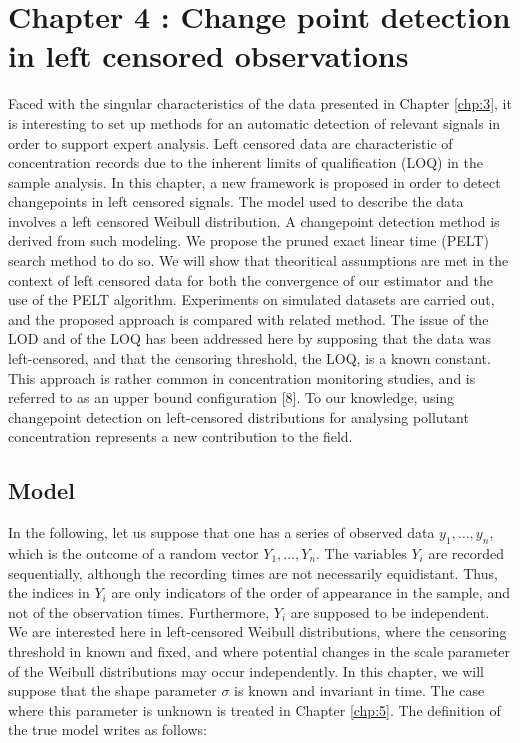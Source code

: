 \chapter{Chapter 4 : Change point detection in left censored observations}\label{chp:4}

\minitoc

Faced with the singular characteristics of the data presented in Chapter \ref{chp:3}, it is interesting to set up methods for an automatic detection of relevant signals in order to support expert analysis. Left censored data are characteristic of concentration records due to the inherent limits of qualification (LOQ) in the sample analysis. In this chapter, a new framework is proposed in order to detect changepoints in left censored signals. The model used to describe the data involves a left censored Weibull distribution. A changepoint detection method is derived from such modeling. We propose the pruned exact linear time (PELT) search method to do so. We will show that theoritical assumptions are met in the context of left censored data for both the convergence of our estimator and the use of the PELT algorithm. Experiments on simulated datasets are carried out, and the proposed approach is compared with related method. The issue of the LOD and of the LOQ has been addressed here by supposing that the data was left-censored, and that the censoring threshold, the LOQ, is a known constant. This approach is rather common in concentration monitoring studies, and is referred to as an upper bound configuration [8]. To our knowledge, using changepoint detection on left-censored distributions for analysing pollutant concentration represents a new contribution to the field. 

\section{Model}

In the following, let us suppose that one has a series of observed data $y_1,\dots,y_n$, which is the outcome of a random vector $Y_1, \dots, Y_n$. The variables $Y_i$ are recorded sequentially, although the recording times are not necessarily equidistant. Thus, the indices in $Y_i$ are only indicators of the order of appearance in the sample, and not of the observation times. Furthermore, $Y_i$ are supposed to be independent. We are interested here in left-censored Weibull distributions, where the censoring threshold in known and fixed, and where potential changes in the scale parameter of the Weibull distributions may occur independently. In this chapter, we will suppose that the shape parameter $\sigma$ is known and invariant in time. The case where this parameter is unknown is treated in Chapter \ref{chp:5}. The definition of the true model writes as follows:

